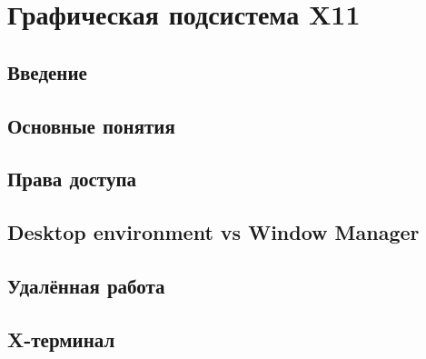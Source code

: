 \chapter{Графическая подсистема X11}
\section{Введение}
\section{Основные понятия}
\section{Права доступа}
\section{Desktop environment vs Window Manager}
\section{Удалённая работа}
\section{X-терминал}
